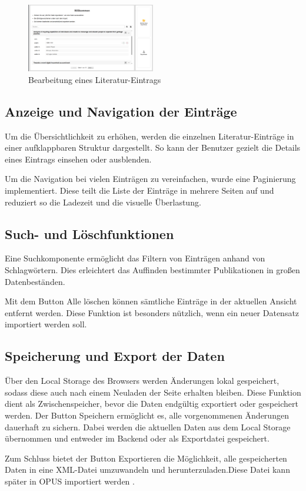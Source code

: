 \begin{figure}[h]
    \centering
    \includegraphics[width=0.5\textwidth]{Graphics/frontend.png}
    \caption{Bearbeitung eines Literatur-Eintrags}
    \label{fig:bearbeiten}
\end{figure}

\subsection{Anzeige und Navigation der Einträge}
Um die Übersichtlichkeit zu erhöhen, werden die einzelnen Literatur-Einträge in einer aufklappbaren
Struktur dargestellt. So kann der Benutzer gezielt die Details eines Eintrags einsehen oder ausblenden.

Um die Navigation bei vielen Einträgen zu vereinfachen, wurde eine Paginierung implementiert.
Diese teilt die Liste der Einträge in mehrere Seiten auf und reduziert so die Ladezeit und die visuelle Überlastung.

\subsection{Such- und Löschfunktionen}
Eine Suchkomponente ermöglicht das Filtern von Einträgen anhand von Schlagwörtern.
Dies erleichtert das Auffinden bestimmter Publikationen in großen Datenbeständen.

Mit dem Button \glqq Alle löschen\grqq{} können sämtliche Einträge in der aktuellen Ansicht entfernt werden.
Diese Funktion ist besonders nützlich, wenn ein neuer Datensatz importiert werden soll.

\subsection{Speicherung und Export der Daten}
Über den Local Storage des Browsers werden Änderungen lokal gespeichert,
sodass diese auch nach einem Neuladen der Seite erhalten bleiben.
Diese Funktion dient als Zwischenspeicher, bevor die Daten endgültig exportiert oder gespeichert werden.
Der Button \glqq Speichern\grqq{} ermöglicht es, alle vorgenommenen Änderungen dauerhaft zu sichern.
Dabei werden die aktuellen Daten aus dem Local Storage übernommen und entweder im Backend oder als Exportdatei gespeichert.

Zum Schluss  bietet der Button \glqq Exportieren\grqq{} die Möglichkeit,
alle gespeicherten Daten in eine XML-Datei umzuwandeln und herunterzuladen.Diese Datei kann später in OPUS importiert werden .
